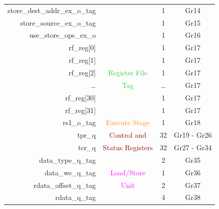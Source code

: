 \begin{table}[t]
\begin{tabular}{@{}rccc@{}}
        store\_dest\_addr\_ex\_o\_tag   &                                       & 1      & Gr14                        \\
        store\_source\_ex\_o\_tag       &                                       & 1      & Gr15                        \\
        use\_store\_ops\_ex\_o          &                                       & 1      & Gr16                        \\\hdashline
        rf\_reg[0]                      &                                       & 1      & Gr17                        \\
        rf\_reg[1]                      &                                       & 1      & Gr17                        \\
        rf\_reg[2]                      & \textcolor{LimeGreen}{Register File}  & 1      & Gr17                        \\
        \ldots                          & \textcolor{LimeGreen}{Tag}            & \ldots & Gr17                        \\
        rf\_reg[30]                     &                                       & 1      & Gr17                        \\
        rf\_reg[31]                     &                                       & 1      & Gr17                        \\\hdashline
        rs1\_o\_tag                     & \textcolor{DarkOrange}{Execute Stage} & 1      & Gr18                        \\\hdashline
        tpr\_q                          & \textcolor{DarkRed}{Control and}      & 32     & Gr19 - Gr26                 \\
        tcr\_q                          & \textcolor{DarkRed}{Status Registers} & 32     & Gr27 - Gr34                 \\\hdashline
        data\_type\_q\_tag              &                                       & 2      & Gr35                        \\
        data\_we\_q\_tag                & \textcolor{magenta}{Load/Store}       & 1      & Gr36                        \\
        rdata\_offset\_q\_tag           & \textcolor{magenta}{Unit}             & 2      & Gr37                        \\
        rdata\_q\_tag                   &                                       & 4      & Gr38                        \\
        \bottomrule
    \end{tabular}
\end{table}

